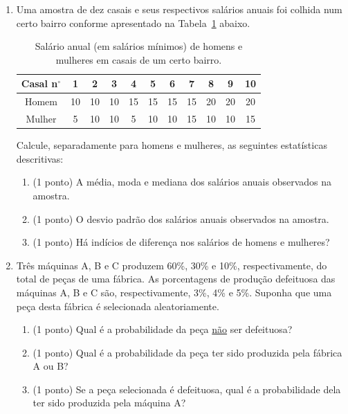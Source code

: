 \documentclass{article}
\begin{document}
\begin{enumerate}
\item Uma amostra de dez casais e seus respectivos salários anuais foi colhida num certo bairro conforme apresentado na Tabela~\ref{t:salarios} abaixo.

\begin{table}[h]
	\centering
	\caption{Salário anual (em salários mínimos) de homens e mulheres em casais de um certo bairro.}
	\label{t:salarios}
\begin{tabular}{c|cccccccccc}
	\hline
	Casal n$^\circ$ & 1 & 2 & 3 & 4 & 5 & 6 & 7 & 8 & 9 & 10 \\
	\hline        
	Homem & 10 & 10 & 10 & 15 & 15 & 15 & 15 & 20 & 20 & 20 \\
	Mulher & 5 & 10 & 10 & 5 & 10 & 10 & 15 & 10 & 10 & 15 \\
	\hline
\end{tabular}	
\end{table}

Calcule, separadamente para homens e mulheres, as seguintes estatísticas descritivas:

\begin{enumerate}
	\item (1 ponto) A média, moda e mediana dos salários anuais observados na amostra.
	\item (1 ponto) O desvio padrão dos salários anuais observados na amostra.
	\item (1 ponto) Há indícios de diferença nos salários de homens e mulheres?
\end{enumerate}


    \item Três máquinas A, B e C produzem 60\%, 30\% e 10\%, respectivamente, do total de peças de uma fábrica. As porcentagens de produção defeituosa das máquinas A, B e C são, respectivamente, 3\%, 4\% e 5\%. Suponha que uma peça desta fábrica é selecionada aleatoriamente. 
\begin{enumerate}
    \item (1 ponto) Qual é a probabilidade da peça \underline{não} ser defeituosa?
    
    \item (1 ponto) Qual é a probabilidade da peça ter sido produzida pela fábrica A ou B?
    
   	\item (1 ponto) Se a peça selecionada é defeituosa, qual é a probabilidade dela ter sido produzida pela máquina A?    
\end{enumerate}



\end{enumerate}
\end{document}
